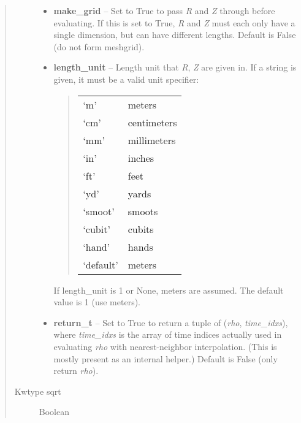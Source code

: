 \documentclass[letterpaper,10pt,english]{sphinxmanual}
\begin{document}
\begin{fulllineitems}
\begin{fulllineitems}
\begin{quote}
\begin{description}
\begin{itemize}
\item {} 
\textbf{make\_grid} -- Set to True to pass \emph{R} and \emph{Z} through
 before evaluating. If this is set to
True, \emph{R} and \emph{Z} must each only have a single dimension, but
can have different lengths. Default is False (do not form
meshgrid).

\item {} 
\textbf{length\_unit} -- 
Length unit that \emph{R}, \emph{Z} are given in.
If a string is given, it must be a valid unit specifier:
\begin{quote}

\begin{tabulary}{\linewidth}{|L|L|}
\hline

`m'
 & 
meters
\\

`cm'
 & 
centimeters
\\

`mm'
 & 
millimeters
\\

`in'
 & 
inches
\\

`ft'
 & 
feet
\\

`yd'
 & 
yards
\\

`smoot'
 & 
smoots
\\

`cubit'
 & 
cubits
\\

`hand'
 & 
hands
\\

`default'
 & 
meters
\\
\hline\end{tabulary}

\end{quote}

If length\_unit is 1 or None, meters are assumed. The default
value is 1 (use meters).


\item {} 
\textbf{return\_t} -- Set to True to return a tuple of (\emph{rho},
\emph{time\_idxs}), where \emph{time\_idxs} is the array of time indices
actually used in evaluating \emph{rho} with nearest-neighbor
interpolation. (This is mostly present as an internal helper.)
Default is False (only return \emph{rho}).

\end{itemize}

\item[{Kwtype sqrt}] \leavevmode
Boolean


\end{description}
\end{quote}
\end{fulllineitems}
\end{fulllineitems}
\end{document}
